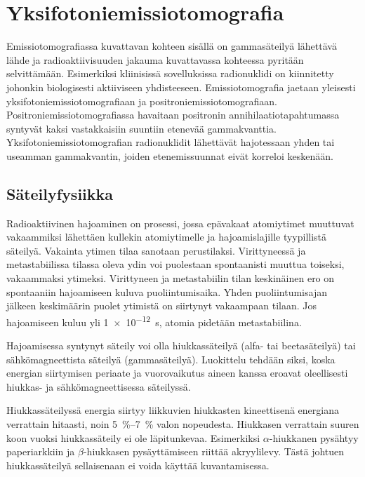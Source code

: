 \section{Yksifotoniemissiotomografia}
Emissiotomografiassa kuvattavan kohteen sisällä on gammasäteilyä lähettävä lähde ja radioaktiivisuuden jakauma kuvattavassa kohteessa pyritään selvittämään\cite{bruyant_analytic_2002, cherry_gamma_2012, van_audenhaege_review_2015}. Esimerkiksi kliinisissä sovelluksissa radionuklidi on kiinnitetty johonkin biologisesti aktiiviseen yhdisteeseen\cite{cherry_single_2012, van_audenhaege_review_2015, bruyant_analytic_2002}. Emissiotomografia jaetaan yleisesti yksifotoniemissiotomografiaan ja positroniemissiotomografiaan. Positroniemissiotomografiassa havaitaan positronin annihilaatiotapahtumassa syntyvät kaksi vastakkaisiin suuntiin etenevää gammakvanttia\cite{cherry_single_2012}. Yksifotoniemissiotomografian radionuklidit lähettävät hajotessaan yhden tai useamman gammakvantin, joiden etenemissuunnat eivät korreloi keskenään\cite{cherry_single_2012, van_audenhaege_review_2015}.

\subsection{Säteilyfysiikka}
Radioaktiivinen hajoaminen on prosessi, jossa epävakaat atomiytimet muuttuvat vakaammiksi lähettäen kullekin atomiytimelle ja hajoamislajille tyypillistä säteilyä. Vakainta ytimen tilaa sanotaan perustilaksi. Virittyneessä ja metastabiilissa tilassa oleva ydin voi puolestaan spontaanisti muuttua toiseksi, vakaammaksi ytimeksi. Virittyneen ja metastabiilin tilan keskinäinen ero on spontaaniin hajoamiseen kuluva puoliintumisaika. Yhden puoliintumisajan jälkeen keskimäärin puolet ytimistä on siirtynyt vakaampaan tilaan. Jos hajoamiseen kuluu yli \qty{1e-12}{\second}, atomia pidetään metastabiilina\cite{cherry_basic_2012}.

Hajoamisessa syntynyt säteily voi olla hiukkassäteilyä (alfa- tai beetasäteilyä) tai sähkömagneettista säteilyä (gammasäteilyä).\cite{cherry_basic_2012, cherry_interaction_2012} Luokittelu tehdään siksi, koska energian siirtymisen periaate ja vuorovaikutus aineen kanssa eroavat oleellisesti hiukkas- ja sähkömagneettisessa säteilyssä.

Hiukkassäteilyssä energia siirtyy liikkuvien hiukkasten kineettisenä energiana verrattain hitaasti, noin \qtyrange{5}{7}{\percent} valon nopeudesta. Hiukkasen verrattain suuren koon vuoksi hiukkassäteily ei ole läpitunkevaa. Esimerkiksi $\alpha$-hiukkanen pysähtyy paperiarkkiin ja $\beta$-hiukkasen pysäyttämiseen riittää akryylilevy.\cite{cherry_interaction_2012} Tästä johtuen hiukkassäteilyä sellaisenaan ei voida käyttää kuvantamisessa\cite{cherry_gamma_2012}.

